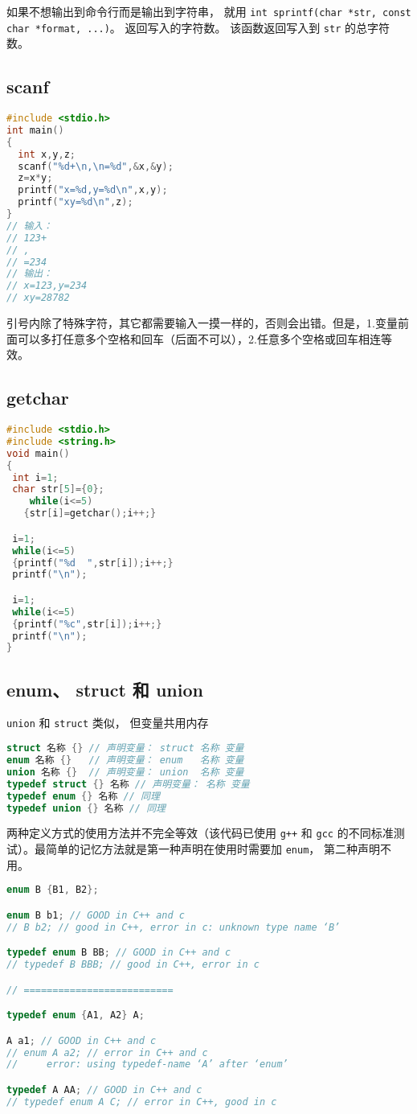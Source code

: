 如果不想输出到命令行而是输出到字符串， 就用 \verb`int sprintf(char *str, const char *format, ...)`。 返回写入的字符数。 该函数返回写入到 \verb`str` 的总字符数。

\subsection{scanf}
\begin{lstlisting}[language=cpp]
#include <stdio.h>
int main()
{
  int x,y,z;
  scanf("%d+\n,\n=%d",&x,&y);
  z=x*y;
  printf("x=%d,y=%d\n",x,y);
  printf("xy=%d\n",z);
}
// 输入：
// 123+
// ,
// =234
// 输出：
// x=123,y=234
// xy=28782
\end{lstlisting}
引号内除了特殊字符，其它都需要输入一摸一样的，否则会出错。但是，1.变量前面可以多打任意多个空格和回车（后面不可以），2.任意多个空格或回车相连等效。

\subsection{getchar}
\begin{lstlisting}[language=cpp]
#include <stdio.h>
#include <string.h>
void main()
{
 int i=1;
 char str[5]={0};
    while(i<=5)
   {str[i]=getchar();i++;}

 i=1;
 while(i<=5)
 {printf("%d  ",str[i]);i++;}
 printf("\n");

 i=1;
 while(i<=5)
 {printf("%c",str[i]);i++;}
 printf("\n");
}
\end{lstlisting}

\subsection{enum、 struct 和 union}
\verb`union` 和 \verb`struct` 类似， 但变量共用内存
\begin{lstlisting}[language=cpp]
struct 名称 {} // 声明变量： struct 名称 变量
enum 名称 {}   // 声明变量： enum   名称 变量
union 名称 {}  // 声明变量： union  名称 变量
typedef struct {} 名称 // 声明变量： 名称 变量
typedef enum {} 名称 // 同理
typedef union {} 名称 // 同理
\end{lstlisting}

两种定义方式的使用方法并不完全等效（该代码已使用 \verb`g++` 和 \verb`gcc` 的不同标准测试）。最简单的记忆方法就是第一种声明在使用时需要加 \verb`enum`， 第二种声明不用。
\begin{lstlisting}[language=cpp]
enum B {B1, B2};

enum B b1; // GOOD in C++ and c
// B b2; // good in C++, error in c: unknown type name ‘B’

typedef enum B BB; // GOOD in C++ and c
// typedef B BBB; // good in C++, error in c

// ==========================

typedef enum {A1, A2} A;

A a1; // GOOD in C++ and c
// enum A a2; // error in C++ and c
//     error: using typedef-name ‘A’ after ‘enum’

typedef A AA; // GOOD in C++ and c
// typedef enum A C; // error in C++, good in c
\end{lstlisting}


